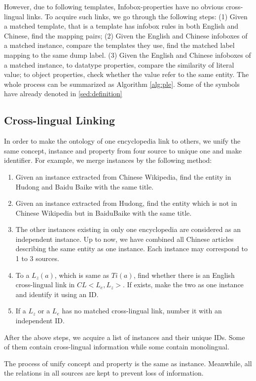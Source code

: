 \documentclass[runningheads,a4paper]{llncs}
\begin{document}
However, due to following templates, Infobox-properties have no obvious cross-lingual links. To acquire such links, we go through the following steps: (1) Given a matched template, that is a template has infobox rules in both English and Chinese, find the mapping pairs; (2) Given the English and Chinese infoboxes of a matched instance, compare the templates they use, find the matched label mapping to the same dump label. (3) Given the English and Chinese infoboxes of a matched instance, to datatype properties, compare the similarity of literal value; to object properties, check whether the value refer to the same entity. The whole process can be summarized as Algorithm \ref{alg:ple}. Some of the symbols have already denoted in \ref{sed:definition}
\subsection{Cross-lingual Linking}
In order to make the ontology of one encyclopedia link to others, we unify the same concept, instance and property from four source to unique one and make identifier. For example, we merge instances by the following method:

\begin{enumerate}[1)]
    \item Given an instance extracted from Chinese Wikipedia, find the entity in Hudong and Baidu Baike with the same title.
    \item Given an instance extracted from Hudong, find the entity which is not in Chinese Wikipedia but in BaiduBaike with the same title.
    \item The other instances existing in only one encyclopedia are considered as an independent instance. Up to now, we have combined all Chinese articles describing the same entity as one instance. Each instance may correspond to 1 to 3 sources.
    \item To a $L_{z}(a)$, which is same as $Ti(a)$, find whether there is an English cross-lingual link in $CL<L_{e}, L_{z}>$. If exists, make the two as one instance and identify it using an ID.
    \item If a $L_{z}$ or a $L_{e}$ has no matched cross-lingual link, number it with an independent ID.
\end{enumerate}

After the above steps, we acquire a list of instances and their unique IDs. Some of them contain cross-lingual information while some contain monolingual.

The process of unify concept and property is the same as instance. Meanwhile, all the relations in all sources are kept to prevent loss of information.
\end{document}
